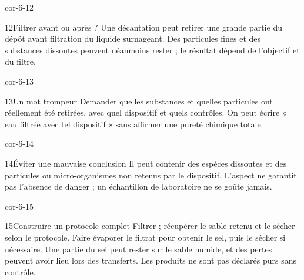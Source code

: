 \documentclass[12pt,twoside,openany]{book}
\begin{document}
\begin{blocLivre}{cor-6-12}
\begin{corrige}{12}{Filtrer avant ou après ?}
Une décantation peut retirer une grande partie du dépôt avant filtration du liquide surnageant. Des particules fines et des substances dissoutes peuvent néanmoins rester ; le résultat dépend de l’objectif et du filtre.\par
\end{corrige}\end{blocLivre}
\begin{blocLivre}{cor-6-13}
\begin{corrige}{13}{Un mot trompeur}
Demander quelles substances et quelles particules ont réellement été retirées, avec quel dispositif et quels contrôles. On peut écrire « eau filtrée avec tel dispositif » sans affirmer une pureté chimique totale.\par
\end{corrige}\end{blocLivre}
\begin{blocLivre}{cor-6-14}
\begin{corrige}{14}{Éviter une mauvaise conclusion}
Il peut contenir des espèces dissoutes et des particules ou micro-organismes non retenus par le dispositif. L’aspect ne garantit pas l’absence de danger ; un échantillon de laboratoire ne se goûte jamais.\par
\end{corrige}\end{blocLivre}
\begin{blocLivre}{cor-6-15}
\begin{corrige}{15}{Construire un protocole complet}
Filtrer ; récupérer le sable retenu et le sécher selon le protocole. Faire évaporer le filtrat pour obtenir le sel, puis le sécher si nécessaire. Une partie du sel peut rester sur le sable humide, et des pertes peuvent avoir lieu lors des transferts. Les produits ne sont pas déclarés purs sans contrôle.\par
{}
\end{corrige}\end{blocLivre}
\label{solutions-6}
\end{document}
